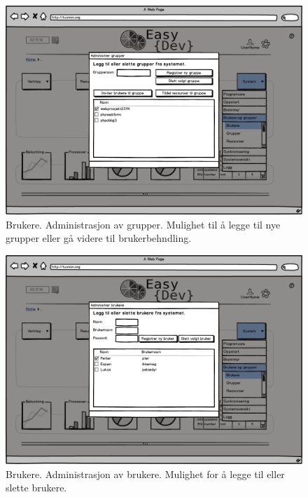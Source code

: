 \begin{figure}[ht]
\centering
\includegraphics[width=\lowB\textwidth,height=\textheight,keepaspectratio]{./img/prosessdokumentasjon/lowfi/b2.png}
\caption[Low-fi Brukere 2]{Brukere. Administrasjon av grupper. Mulighet til å legge til nye grupper eller gå videre til brukerbehndling.}
\label{fig:brukerelow2}
\end{figure}

\begin{figure}[ht]
\centering
\includegraphics[width=\lowB\textwidth,height=\textheight,keepaspectratio]{./img/prosessdokumentasjon/lowfi/b3.png}
\caption[Low-fi Brukere 3]{Brukere. Administrasjon av brukere. Mulighet for å legge til eller slette brukere.}
\label{fig:brukerelow3}
\end{figure}

